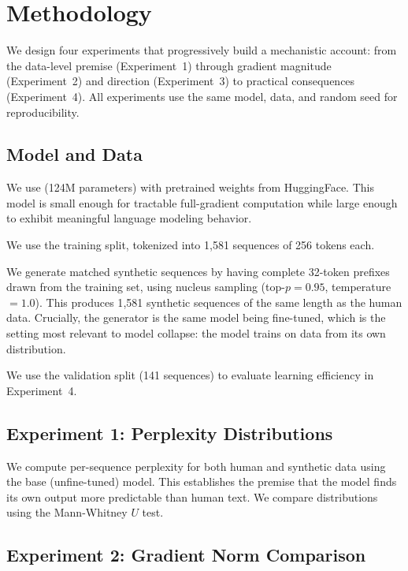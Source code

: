 \section{Methodology}
\label{sec:method}

We design four experiments that progressively build a mechanistic account: from the data-level premise (Experiment~1) through gradient magnitude (Experiment~2) and direction (Experiment~3) to practical consequences (Experiment~4). All experiments use the same model, data, and random seed for reproducibility.

\subsection{Model and Data}
\label{sec:model_data}

 We use \gptsmall (124M parameters) with pretrained weights from HuggingFace. This model is small enough for tractable full-gradient computation while large enough to exhibit meaningful language modeling behavior.

 We use the \wikitext training split, tokenized into 1{,}581 sequences of 256 tokens each.

 We generate matched synthetic sequences by having \gptsmall complete 32-token prefixes drawn from the \wikitext training set, using nucleus sampling (top-$p = 0.95$, temperature $= 1.0$). This produces 1{,}581 synthetic sequences of the same length as the human data. Crucially, the generator is the same model being fine-tuned, which is the setting most relevant to model collapse: the model trains on data from its own distribution.

 We use the \wikitext validation split (141 sequences) to evaluate learning efficiency in Experiment~4.

\subsection{Experiment 1: Perplexity Distributions}
\label{sec:exp1}

We compute per-sequence perplexity for both human and synthetic data using the base (unfine-tuned) \gptsmall model. This establishes the premise that the model finds its own output more predictable than human text. We compare distributions using the Mann-Whitney $U$ test.

\subsection{Experiment 2: Gradient Norm Comparison}
\label{sec:exp2}

